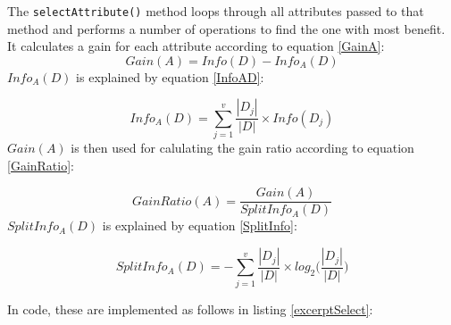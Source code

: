 \documentclass{article}
\begin{document}
    The \verb|selectAttribute()| method loops through all attributes passed to that method and performs a number of operations to find the one with most benefit. It calculates a gain for each attribute according to equation \ref{GainA}:
    \begin{equation} \label{GainA}
    Gain(A)=Info(D)-Info_A (D)
    \end{equation}
    $Info_A (D)$ is explained by equation \ref{InfoAD}:

    \begin{equation} \label{InfoAD}
    Info_A (D)=\sum_{j=1}^{v}\frac{|D_j|}{|D|}\times Info(D_j)
    \end{equation}
    $Gain(A)$ is then used for calulating the gain ratio according to equation \ref{GainRatio}:

    \begin{equation} \label{GainRatio}
    GainRatio(A)=\frac{Gain(A)}{SplitInfo_A (D)}
    \end{equation}
    $SplitInfo_A (D)$ is explained by equation \ref{SplitInfo}:

    \begin{equation} \label{SplitInfo}
    SplitInfo_A (D)=-\sum_{j=1}^{v}\frac{|D_j|}{|D|} \times log_2\bigg( \frac{|D_j|}{|D|}\bigg)
    \end{equation}

    \newpage

    In code, these are implemented as follows in listing \ref{excerptSelect}:
\end{document}
